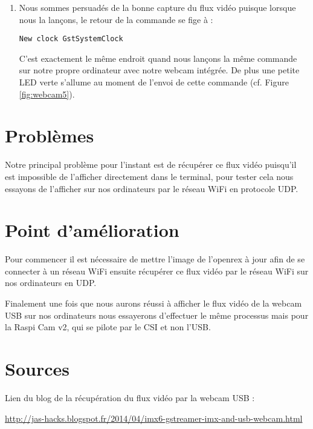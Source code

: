 \begin{enumerate}
\item Nous sommes persuadés de la bonne capture du flux vidéo puisque lorsque
nous la lançons, le retour de la commande se fige à :

\begin{lstlisting}
New clock GstSystemClock
\end{lstlisting}

C'est exactement le même endroit quand nous lançons la même commande sur notre
propre ordinateur avec notre webcam intégrée. De plus une petite LED verte s’allume
au moment de l’envoi de cette commande (cf. Figure \ref{fig:webcam5}).

\end{enumerate}

\section{Problèmes}

Notre principal problème pour l’instant est de récupérer ce flux vidéo puisqu’il
est impossible de l’afficher directement dans le terminal, pour tester cela nous
essayons de l’afficher sur nos ordinateurs par le réseau WiFi en protocole UDP.

\section{Point d'amélioration}

Pour commencer il est nécessaire de mettre l’image de l'openrex à jour afin de se
connecter à un réseau WiFi ensuite récupérer ce flux vidéo par le réseau WiFi sur
nos ordinateurs en UDP.

Finalement une fois que nous aurons réussi à afficher le flux vidéo de la webcam
USB sur nos ordinateurs nous essayerons d’effectuer le même processus mais pour
la Raspi Cam v2, qui se pilote par le CSI et non l’USB.

\section{Sources}

Lien du blog de la récupération du flux vidéo par la webcam USB :

\href{http://jas-hacks.blogspot.fr/2014/04/imx6-gstreamer-imx-and-usb-webcam.html}
{http://jas-hacks.blogspot.fr/2014/04/imx6-gstreamer-imx-and-usb-webcam.html}

